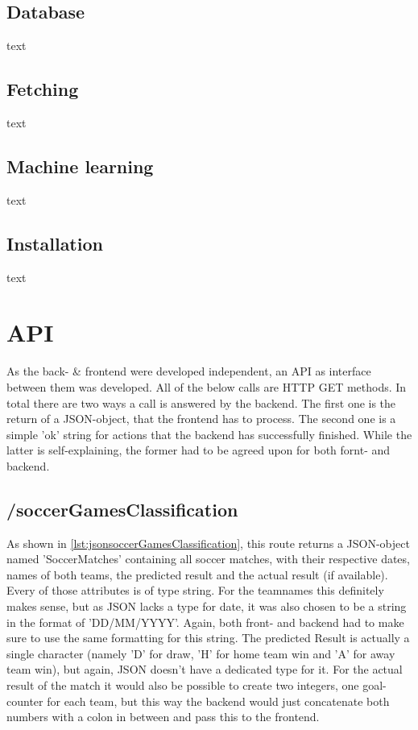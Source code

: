 \subsection{Database}
text

\subsection{Fetching}
text

\subsection{Machine learning}
text

\subsection{Installation}
text


\section{API}
As the back- \& frontend were developed independent, an API as interface between them was developed. All of the below calls are HTTP GET methods.
\newline
In total there are two ways a call is answered by the backend. The first one is the return of a JSON-object, that the frontend has to process. The second one is a simple 'ok' string for actions that the backend has successfully finished. While the latter is self-explaining, the former had to be agreed upon for both fornt- and backend.

\subsection{/soccerGamesClassification}
As shown in \ref{lst:jsonsoccerGamesClassification}, this route returns a JSON-object named 'SoccerMatches' containing all soccer matches, with their respective dates, names of both teams, the predicted result and the actual result (if available). Every of those attributes is of type string. For the teamnames this definitely makes sense, but as JSON lacks a type for date, it was also chosen to be a string in the format of 'DD/MM/YYYY'. Again, both front- and backend had to make sure to use the same formatting for this string. The predicted Result is actually a single character (namely 'D' for draw, 'H' for home team win and 'A' for away team win), but again, JSON doesn't have a dedicated type for it. For the actual result of the match it would also be possible to create two integers, one goal-counter for each team, but this way the backend would just concatenate both numbers with a colon in between and pass this to the frontend.

